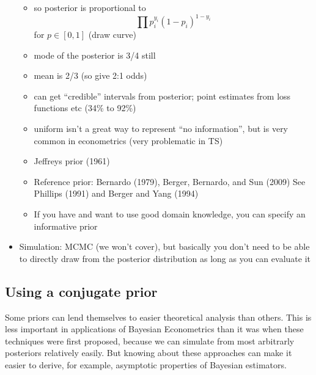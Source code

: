 \begin{itemize}
\begin{itemize}
  \item so posterior is proportional to 
    \[∏ p_i^{y_i} (1 - p_i)^{1 - y_i}\] for $p ∈ [0,1]$ (draw curve)
  \item mode of the posterior is 3/4 still
  \item mean is 2/3 (so give 2:1 odds)
  \item can get ``credible'' intervals from posterior; point estimates
    from loss functions etc (34\% to 92\%)
  \item uniform isn't a great way to represent ``no information'', but
    is very common in econometrics (very problematic in TS)
  \item Jeffreys prior (1961)
  \item Reference prior: Bernardo (1979), Berger, Bernardo, and Sun
    (2009) See Phillips (1991) and Berger and Yang (1994)
  \item If you have and want to use good domain knowledge, you can
    specify an informative prior
  \end{itemize}
\item Simulation: MCMC (we won't cover), but basically you don't need
  to be able to directly draw from the posterior distribution as long
  as you can evaluate it
\end{itemize}

\subsection{Using a conjugate prior}
Some priors can lend themselves to easier theoretical analysis than
others.  This is less important in applications of Bayesian
Econometrics than it was when these techniques were first proposed,
because we can simulate from most arbitrarly posteriors relatively
easily.  But knowing about these approaches can make it easier to
derive, for example, asymptotic properties of Bayesian estimators.

